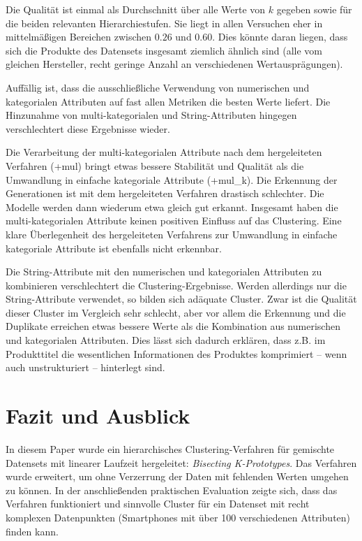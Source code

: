 Die Qualität ist einmal als Durchschnitt über alle Werte von \(k\)
gegeben sowie für die beiden relevanten Hierarchiestufen. Sie liegt in
allen Versuchen eher in mittelmäßigen Bereichen zwischen \(0.26\) und
\(0.60\). Dies könnte daran liegen, dass sich die Produkte des Datensets
insgesamt ziemlich ähnlich sind (alle vom gleichen Hersteller, recht
geringe Anzahl an verschiedenen Wertausprägungen).

Auffällig ist, dass die ausschließliche Verwendung von numerischen und
kategorialen Attributen auf fast allen Metriken die besten Werte
liefert. Die Hinzunahme von multi-kategorialen und String-Attributen
hingegen verschlechtert diese Ergebnisse wieder.

Die Verarbeitung der multi-kategorialen Attribute nach dem hergeleiteten
Verfahren (+mul) bringt etwas bessere Stabilität und Qualität als die
Umwandlung in einfache kategoriale Attribute (+mul\_k). Die Erkennung
der Generationen ist mit dem hergeleiteten Verfahren drastisch
schlechter. Die Modelle werden dann wiederum etwa gleich gut erkannt.
Insgesamt haben die multi-kategorialen Attribute keinen positiven
Einfluss auf das Clustering. Eine klare Überlegenheit des hergeleiteten
Verfahrens zur Umwandlung in einfache kategoriale Attribute ist
ebenfalls nicht erkennbar.

Die String-Attribute mit den numerischen und kategorialen Attributen zu
kombinieren verschlechtert die Clustering-Ergebnisse. Werden allerdings
nur die String-Attribute verwendet, so bilden sich adäquate Cluster.
Zwar ist die Qualität dieser Cluster im Vergleich sehr schlecht, aber
vor allem die Erkennung und die Duplikate erreichen etwas bessere Werte
als die Kombination aus numerischen und kategorialen Attributen. Dies
lässt sich dadurch erklären, dass z.B. im Produkttitel die wesentlichen
Informationen des Produktes komprimiert -- wenn auch unstrukturiert --
hinterlegt sind.

\hypertarget{fazit-und-ausblick}{%
\section{Fazit und Ausblick}\label{fazit-und-ausblick}}

In diesem Paper wurde ein hierarchisches Clustering-Verfahren für
gemischte Datensets mit linearer Laufzeit hergeleitet: \emph{Bisecting
K-Prototypes}. Das Verfahren wurde erweitert, um ohne Verzerrung der
Daten mit fehlenden Werten umgehen zu können. In der anschließenden
praktischen Evaluation zeigte sich, dass das Verfahren funktioniert und
sinnvolle Cluster für ein Datenset mit recht komplexen Datenpunkten
(Smartphones mit über 100 verschiedenen Attributen) finden kann.

